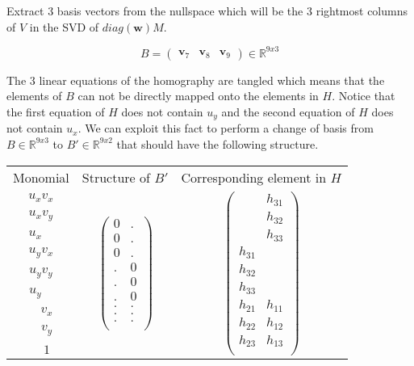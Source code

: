 Extract 3 basis vectors from the nullspace which will be the 3 rightmost columns of $ V $ in the SVD of $diag(\textbf{w})M$.

\[
B = 
\begin{pmatrix}
\textbf{v}_7 & \textbf{v}_8 & \textbf{v}_9
\end{pmatrix}
\in \mathbb{R}^{9x3}
\]

The 3 linear equations of the homography are tangled which means that the elements of $B$ can not be directly mapped onto the elements in $H$. Notice that the first equation of $H$ does not contain $u_y$ and the second equation of $H$ does not contain $u_x$. We can exploit this fact to perform a change of basis from $B \in \mathbb{R}^{9x3}$ to $B' \in \mathbb{R}^{9x2}$ that should have the following structure.

\begin{center}
\begin{tabular}{ c c c }
	Monomial & Structure of $B'$ & Corresponding element in $H$ \\
	$u_x v_x$ & \multirow{9}{*}{
$\begin{pmatrix}
	0 & . \\
	0 & . \\
	0 & . \\
	. & 0 \\
	. & 0 \\
	. & 0 \\
	. & . \\
	. & . \\
	. & . \\
\end{pmatrix}$
} & \multirow{9}{*}{
$\begin{pmatrix}
 & h_{31} \\
 & h_{32} \\
 & h_{33} \\
h_{31} &   \\
h_{32} &   \\
h_{33} &   \\
h_{21} & h_{11} \\
h_{22} & h_{12} \\
h_{23} & h_{13} \\
\end{pmatrix}$
} \\
	$u_x v_y$ & \\
	$u_x \ \ \ \ $ & \\    
	\hline
	$u_y v_x$ & \\
	$u_y v_y$ & \\
	$u_y \ \ \ \ $ & \\    
	\hline
	$\ \ \ \ v_x$ & \\
	$\ \ \ \ v_y$ & \\
	$\ \ \ \ 1$ & \\
\end{tabular}
\end{center}

